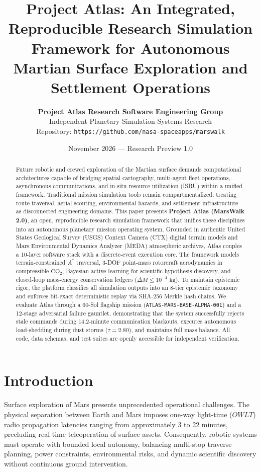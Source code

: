 \documentclass[10pt,journal,compsoc,twocolumn]{article}
\title{\textbf{Project Atlas: An Integrated, Reproducible Research Simulation Framework for Autonomous Martian Surface Exploration and Settlement Operations}}
\author{
    \textbf{Project Atlas Research Software Engineering Group}\\
    \small Independent Planetary Simulation Systems Research\\
    \small Repository: \texttt{https://github.com/nasa-spaceapps/marswalk}
}
\date{November 2026 --- Research Preview 1.0}
\begin{document}
\maketitle

\begin{abstract}
Future robotic and crewed exploration of the Martian surface demands computational architectures capable of bridging spatial cartography, multi-agent fleet operations, asynchronous communications, and in-situ resource utilization (ISRU) within a unified framework. Traditional mission simulation tools remain compartmentalized, treating route traversal, aerial scouting, environmental hazards, and settlement infrastructure as disconnected engineering domains. This paper presents \textbf{Project Atlas (MarsWalk 2.0)}, an open, reproducible research simulation framework that unifies these disciplines into an autonomous planetary mission operating system. Grounded in authentic United States Geological Survey (USGS) Context Camera (CTX) digital terrain models and Mars Environmental Dynamics Analyzer (MEDA) atmospheric archives, Atlas couples a 10-layer software stack with a discrete-event execution core. The framework models terrain-constrained $A^*$ traversal, 3-DOF point-mass rotorcraft aerodynamics in compressible $\text{CO}_2$, Bayesian active learning for scientific hypothesis discovery, and closed-loop mass-energy conservation ledgers ($\Delta M \le 10^{-4}\text{ kg}$). To maintain epistemic rigor, the platform classifies all simulation outputs into an 8-tier epistemic taxonomy and enforces bit-exact deterministic replay via SHA-256 Merkle hash chains. We evaluate Atlas through a 60-Sol flagship mission (\texttt{ATLAS-MARS-BASE-ALPHA-001}) and a 12-stage adversarial failure gauntlet, demonstrating that the system successfully rejects stale commands during 14.2-minute communication blackouts, executes autonomous load-shedding during dust storms ($\tau = 2.80$), and maintains full mass balance. All code, data schemas, and test suites are openly accessible for independent verification.
\end{abstract}

\section{Introduction}
Surface exploration of Mars presents unprecedented operational challenges. The physical separation between Earth and Mars imposes one-way light-time ($OWLT$) radio propagation latencies ranging from approximately 3 to 22 minutes, precluding real-time teleoperation of surface assets. Consequently, robotic systems must operate with bounded local autonomy, balancing multi-stop traverse planning, power constraints, environmental risks, and dynamic scientific discovery without continuous ground intervention.
\end{document}
